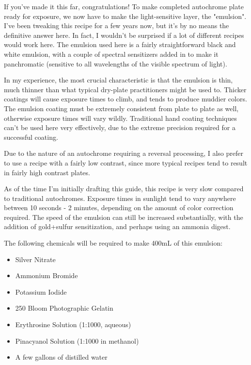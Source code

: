 \documentclass[11pt]{article}
\begin{document}
If you've made it this far, congratulations! To make completed autochrome plate ready for exposure, we now have to make the light-sensitive layer, the "emulsion". I've been tweaking this recipe for a few years now, but it's by no means the definitive answer here. In fact, I wouldn't be surprised if a lot of different recipes would work here. The emulsion used here is a fairly straightforward black and white emulsion, with a couple of spectral sensitizers added in to make it panchromatic (sensitive to all wavelengths of the visible spectrum of light).\newline

In my experience, the most crucial characteristic is that the emulsion is thin, much thinner than what typical dry-plate practitioners might be used to. Thicker coatings will cause exposure times to climb, and tends to produce muddier colors. The emulsion coating must be extremely consistent from plate to plate as well, otherwise exposure times will vary wildly. Traditional hand coating techniques can't be used here very effectively, due to the extreme precision required for a successful coating.\newline

Due to the nature of an autochrome requiring a reversal processing, I also prefer to use a recipe with a fairly low contrast, since more typical recipes tend to result in fairly high contrast plates.\newline

As of the time I'm initially drafting this guide, this recipe is very slow compared to traditional autochromes. Exposure times in sunlight tend to vary anywhere between 10 seconds - 2 minutes, depending on the amount of color correction required. The speed of the emulsion can still be increased substantially, with the addition of gold+sulfur sensitization, and perhaps using an ammonia digest.\newline

The following chemicals will be required to make 400mL of this emulsion:
\begin{itemize}
	\item Silver Nitrate
	\item Ammonium Bromide
	\item Potassium Iodide
	\item 250 Bloom Photographic Gelatin
	\item Erythrosine Solution (1:1000, aqueous)
	\item Pinacyanol Solution (1:1000 in methanol)
	\item A few gallons of distilled water
\end{itemize}
\end{document}
